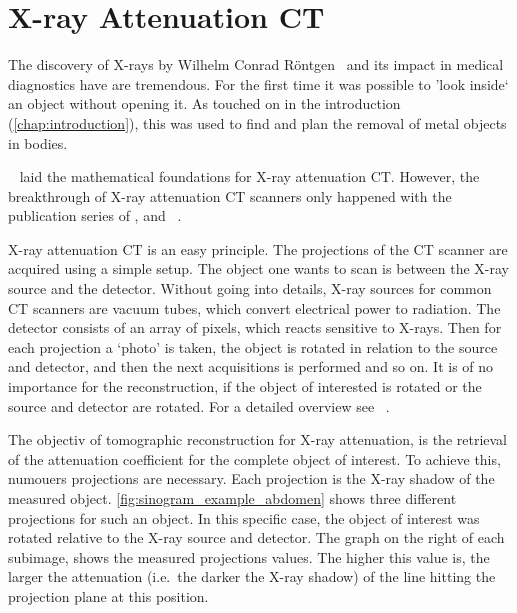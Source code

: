 \section{X-ray Attenuation CT}\label{sec:xray_attenuation_ct}

The discovery of X-rays by Wilhelm Conrad Röntgen~\cite{rontgen_uber_1895} and its impact in medical
diagnostics have are tremendous. For the first time it was possible to 'look inside` an object
without opening it. As touched on in the introduction (\ref{chap:introduction}), this was used
to find and plan the removal of metal objects in bodies.

\citeauthor*{cormack_representation_1963}~\cite{cormack_representation_1963} laid the mathematical
foundations for X-ray attenuation CT. However, the breakthrough of X-ray attenuation CT scanners
only happened with the publication series of
\citeauthor{hounsfield_computerized_1973}\cite{hounsfield_computerized_1973},
\citeauthor{ambrose_computerized_1973}\cite{ambrose_computerized_1973} and
~\citeauthor{perry_computerized_1973}\cite{perry_computerized_1973}.

X-ray attenuation CT is an easy principle. The projections of the CT scanner are acquired using a
simple setup. The object one wants to scan is between the X-ray source and the detector. Without
going into details, X-ray sources for common CT scanners are vacuum tubes, which convert electrical
power to radiation. The detector consists of an array of pixels, which reacts sensitive to X-rays.
Then for each projection a `photo' is taken, the object is rotated in relation to the source and
detector, and then the next acquisitions is performed and so on. It is of no importance for the
reconstruction, if the object of interested is rotated or the source and detector are rotated. For a
detailed overview see \citeauthor{buzug_computed_2008}~\cite[Chapter~2]{buzug_computed_2008}.

The objectiv of tomographic reconstruction for X-ray attenuation, is the retrieval of the
attenuation coefficient for the complete object of interest. To achieve this, numouers projections
are necessary. Each projection is the X-ray shadow of the measured object.
\autoref{fig:sinogram_example_abdomen} shows three different projections for such an object. In this
specific case, the object of interest was rotated relative to the X-ray source and detector.
The graph on the right of each subimage, shows the measured projections values. The higher this
value is, the larger the attenuation (i.e.\ the darker the X-ray shadow) of the line hitting the
projection plane at this position.

